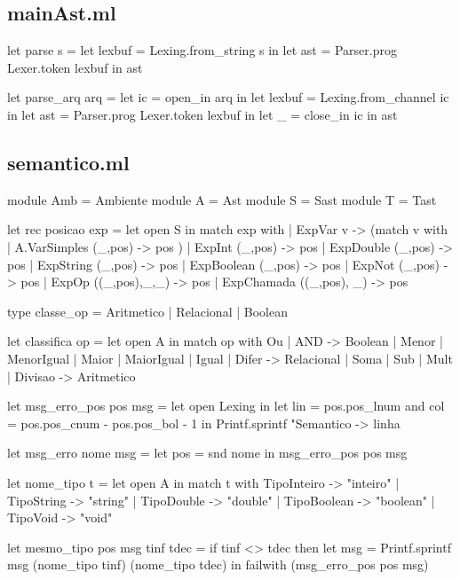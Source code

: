 \documentclass[12pt,a4paper,twoside]{report}
\begin{document}
\subsection{mainAst.ml}
\begin{terminal}
let parse s =
  let lexbuf = Lexing.from_string s in
  let ast = Parser.prog Lexer.token lexbuf in
  ast

let parse_arq arq =
  let ic = open_in arq in
  let lexbuf = Lexing.from_channel ic in
  let ast = Parser.prog Lexer.token lexbuf in
  let _ = close_in ic in
  ast
\end{terminal}

\subsection{semantico.ml}
\begin{terminal}
module Amb = Ambiente
module A = Ast
module S = Sast
module T = Tast

let rec posicao exp = let open S in
  match exp with
  | ExpVar v -> (match v with
      | A.VarSimples (_,pos) -> pos
    )
  | ExpInt (_,pos) -> pos
  | ExpDouble (_,pos) -> pos
  | ExpString  (_,pos) -> pos
  | ExpBoolean (_,pos) -> pos
  | ExpNot (_,pos) -> pos
  | ExpOp ((_,pos),_,_)  -> pos
  | ExpChamada ((_,pos), _) -> pos

type classe_op = Aritmetico | Relacional | Boolean

let classifica op =
  let open A in
  match op with
    Ou
  | AND -> Boolean
  | Menor
  | MenorIgual
  | Maior
  | MaiorIgual
  | Igual
  | Difer -> Relacional
  | Soma
  | Sub
  | Mult
  | Divisao -> Aritmetico

let msg_erro_pos pos msg =
  let open Lexing in
  let lin = pos.pos_lnum
  and col = pos.pos_cnum - pos.pos_bol - 1 in
  Printf.sprintf "Semantico -> linha %

let msg_erro nome msg =
  let pos = snd nome in
  msg_erro_pos pos msg

let nome_tipo t =
  let open A in
    match t with
      TipoInteiro -> "inteiro"
    | TipoString -> "string"
    | TipoDouble -> "double"
    | TipoBoolean -> "boolean"
    | TipoVoid -> "void"

let mesmo_tipo pos msg tinf tdec =
  if tinf <> tdec
  then
    let msg = Printf.sprintf msg (nome_tipo tinf) (nome_tipo tdec) in
    failwith (msg_erro_pos pos msg)


\end{terminal}
\end{document}
